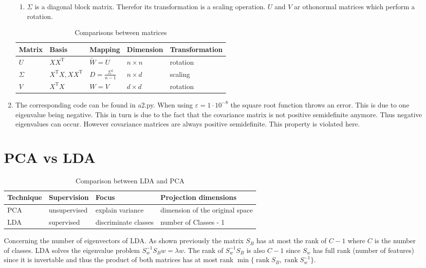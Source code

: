 \documentclass[DIN, pagenumber=false, fontsize=11pt, parskip=half]{scrartcl}
\DeclareMathOperator{\rank}{rank}
\begin{document}
\begin{enumerate}
\begin{enumerate}
            \item
            $\Sigma$ is a diagonal block matrix. Therefor its transformation is a scaling operation. $U$ and $V$ ar othonormal matrices which perform a
            rotation.
        \end{enumerate}
            \begin{table}[H]
                \centering
                \begin{tabularx}{\textwidth}{lllll}
                    \toprule
                    Matrix & Basis & Mapping & Dimension & Transformation \\
                    \midrule
                    $U$ & $X X^\text{T}$ & $\widetilde{W} = U$ & $n \times n$ & rotation \\
                    $\Sigma $ & $X^\text{T}X, XX^\text{T}$ & $D = \frac{\Sigma^2}{n-1}$ & $n \times d$ & scaling \\
                    $V$ & $X^\text{T} X$ & $W = V$ & $d \times d$ & rotation \\
                    \bottomrule
                \end{tabularx}
                \caption{Comparisons between matrices}
            \end{table}

        \item
        The corresponding code can be found in a2.py.
        When using $\varepsilon = 1 \cdot 10^{-8}$ the square root function throws an error. This is due to one eigenvalue being negative.
        This in turn is due to the fact that the covariance matrix is not positive semidefinite anymore. Thus negative eigenvalues can occur.
        However covariance matrices are always positive semidefinite. This property is violated here.
    \end{enumerate}
    \section{PCA vs LDA}
    \begin{table}[H]
        \centering
        \begin{tabularx}{\textwidth}{llll}
            \toprule
            Technique & Supervision & Focus & Projection dimensions \\
            \midrule
            PCA & unsupervised & explain variance & dimension of the original space\\
            LDA & supervised & discriminate classes &  number of Classes - 1\\
            \bottomrule
        \end{tabularx}
        \caption{Comparison between LDA and PCA}
    \end{table}
    Concerning the number of eigenvectors of LDA. As shown previously the matrix $S_B$ has at most the rank of $C-1$ where $C$ is the number
    of classes. LDA solves the eigenvalue problem $S_w^{-1} S_B w = \lambda w$. The rank of $S_w^{-1} S_B$ is also $C-1$ since $S_w$ has full
    rank (number of features) since it is invertable and thus the product of both matrices has at most rank $\min\{\rank S_B, \rank S_w^{-1}\}$.
\end{document}
